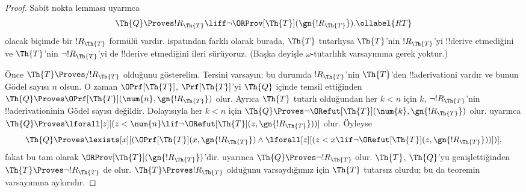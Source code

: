 \documentclass[../../../include/open-logic-section]{subfiles}
\begin{document}
\begin{proof}
Sabit nokta lemması uyarınca
\begin{equation}
  \Th{Q} \Proves !R_\Th{T} \liff \lnot \ORProv[\Th{T}](\gn{!R_\Th{T}}).
  \ollabel{RT}
\end{equation}
olacak biçimde bir $!R_\Th{T}$ formülü vardır.
 ispatından farklı olarak burada,
$\Th{T}$ tutarlıysa $\Th{T}$'nin $!R_\Th{T}$'yi !!{derive} etmediğini ve
$\Th{T}$'nin $\lnot !R_\Th{T}$'yi de !!{derive} etmediğini ileri sürüyoruz. (Başka deyişle
$\omega$-tutarlılık varsayımına gerek yoktur.)

Önce $\Th{T} \Proves/ !R_{\Th{T}}$ olduğunu gösterelim. Tersini varsayın;
bu durumda $!R_{\Th{T}}$'nin $\Th{T}$'den !!a{derivation}{}i vardır ve bunun
G\"odel sayısı $n$ olsun. O zaman $\OPrf[\Th{T}]$, $\Prf[\Th{T}]$'yi
$\Th{Q}$ içinde temsil ettiğinden
$\Th{Q} \Proves \OPrf[\Th{T}](\num{n},\gn{!R_{\Th{T}}})$ olur. Ayrıca
$\Th{T}$ tutarlı olduğundan her $k<n$ için $k$, $\lnot !R_{\Th{T}}$'nin
!!a{derivation}{}inin G\"odel sayısı değildir. Dolayısıyla her $k<n$ için
$\Th{Q} \Proves \lnot \ORefut[\Th{T}](\num{k},\gn{!R_{\Th{T}}})$ olur.
 uyarınca
$\Th{Q} \Proves \lforall[z][(z < \num{n} \lif \lnot \ORefut[\Th{T}](z,
  \gn{!R_{\Th{T}}}))]$ olur. Öyleyse
\[
\Th{Q} \Proves \lexists[x][(\OPrf[\Th{T}](x,\gn{!R_{\Th{T}}}) \land \lforall[z][(z
    < x \lif \lnot \ORefut[\Th{T}](z,\gn{!R_{\Th{T}}}))])],
\]
fakat bu tam olarak $\ORProv[\Th{T}](\gn{!R_{\Th{T}}})$'dir. 
uyarınca $\Th{Q} \Proves \lnot !R_{\Th{T}}$ olur. $\Th{T}$, $\Th{Q}$'yu
genişlettiğinden $\Th{T} \Proves \lnot !R_{\Th{T}}$ de olur.
$\Th{T} \Proves !R_{\Th{T}}$ olduğunu varsaydığımız için $\Th{T}$ tutarsız
olurdu; bu da teoremin varsayımına aykırıdır.


\end{proof}
\end{document}
